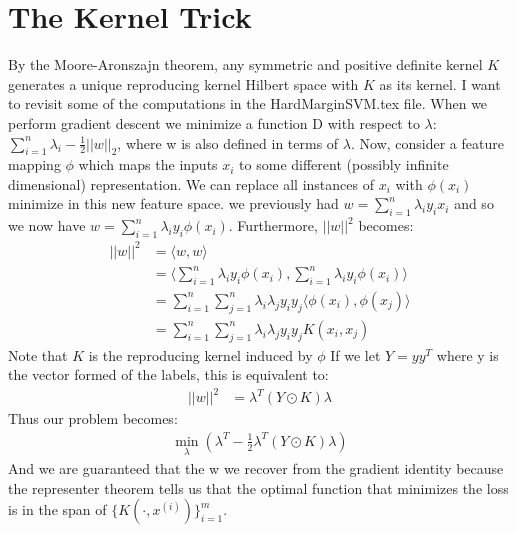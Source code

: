 \documentclass[12pt]{article}
\begin{document}
\section*{The Kernel Trick}
By the Moore-Aronszajn theorem, any symmetric and positive definite kernel $K$ generates a unique reproducing kernel Hilbert space with $K$ as its kernel. I want to revisit
some of the computations in the HardMarginSVM.tex file. When we perform gradient descent we minimize
a function D with respect to $\lambda$: $\displaystyle \sum_{i = 1}^n \lambda_i - \frac{1}{2}||w||_2$, where w is also defined in terms of $\lambda$.
Now, consider a feature mapping $\phi$ which maps the inputs $x_i$ to some different
(possibly infinite dimensional) representation. We can replace all instances of $x_i$
with $\phi(x_i)$ minimize in this new feature space. we previously had $w = \displaystyle \sum_{i=1}^n \lambda_iy_ix_i$
and so we now have $w = \displaystyle \sum_{i = 1}^n \lambda_iy_i\phi(x_i)$.
Furthermore, $||w||^2$ becomes:
\begin{align*}
    ||w||^2 &= \langle w, w\rangle \\
    &= \langle \displaystyle \sum_{i = 1}^n \lambda_iy_i\phi(x_i), \displaystyle \sum_{i = 1}^n \lambda_iy_i\phi(x_i) \rangle \\
    &= \displaystyle \sum_{i = 1}^n \sum_{j =1}^n \lambda_i\lambda_jy_iy_j\langle \phi(x_i), \phi(x_j) \rangle \\
    &=  \displaystyle \sum_{i = 1}^n \sum_{j =1}^n \lambda_i\lambda_jy_iy_jK(x_i, x_j) 
\end{align*}
Note that $K$ is the reproducing kernel induced by $\phi$ If we let $Y = yy^T$ where y is the vector formed of the labels, this is equivalent to:
\begin{align*}
    ||w||^2 &= \lambda^T (Y \odot K)\lambda
\end{align*}
Thus our problem becomes:
\begin{align*}
    \displaystyle \min_\lambda(\lambda^T - \frac{1}{2}\lambda^T(Y \odot K)\lambda)
\end{align*}
And we are guaranteed that the w we recover from the gradient identity because the representer theorem
tells us that the optimal function that minimizes the loss is in the span of $\{K(\cdot, x^{(i)})\}^m_{i=1}$.
\end{document}
